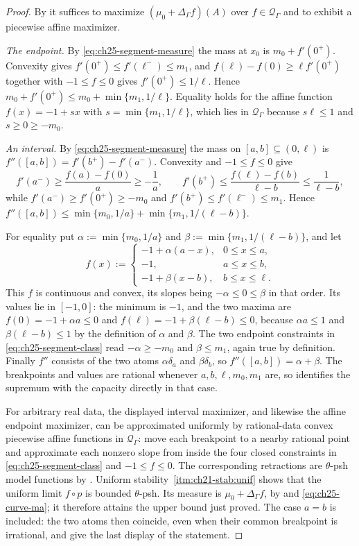 \begin{proof}
By  it suffices to maximize
$(\mu_0+\Delta_\Gamma f)(A)$ over $f\in\mathcal Q_\Gamma$ and to exhibit
a piecewise affine maximizer.

\emph{The endpoint.}  By \eqref{eq:ch25-segment-measure} the mass at $x_0$
is $m_0+f'(0^+)$.  Convexity gives
$f'(0^+)\leq f'(\ell^-)\leq m_1$, and
$f(\ell)-f(0)\geq\ell f'(0^+)$ together with $-1\leq f\leq0$ gives
$f'(0^+)\leq1/\ell$.  Hence
$m_0+f'(0^+)\leq m_0+\min\{m_1,1/\ell\}$.  Equality holds for the affine
function $f(x)=-1+sx$ with $s=\min\{m_1,1/\ell\}$, which lies in
$\mathcal Q_\Gamma$ because $s\ell\leq1$ and $s\geq0\geq-m_0$.

\emph{An interval.}  By \eqref{eq:ch25-segment-measure} the mass on
$[a,b]\subseteq(0,\ell)$ is $f''([a,b])=f'(b^+)-f'(a^-)$.  Convexity and
$-1\leq f\leq0$ give
\[
 f'(a^-)\geq\frac{f(a)-f(0)}{a}\geq-\frac1a,
 \qquad
 f'(b^+)\leq\frac{f(\ell)-f(b)}{\ell-b}\leq\frac1{\ell-b},
\]
while $f'(a^-)\geq f'(0^+)\geq-m_0$ and
$f'(b^+)\leq f'(\ell^-)\leq m_1$.  Hence
$f''([a,b])\leq\min\{m_0,1/a\}+\min\{m_1,1/(\ell-b)\}$.

For equality put $\alpha:=\min\{m_0,1/a\}$ and
$\beta:=\min\{m_1,1/(\ell-b)\}$, and let
\[
 f(x):=\begin{cases}
  -1+\alpha(a-x),&0\leq x\leq a,\\
  -1,&a\leq x\leq b,\\
  -1+\beta(x-b),&b\leq x\leq\ell .
 \end{cases}
\]
This $f$ is continuous and convex, its slopes being
$-\alpha\leq0\leq\beta$ in that order.  Its values lie in $[-1,0]$: the
minimum is $-1$, and the two maxima are $f(0)=-1+\alpha a\leq0$ and
$f(\ell)=-1+\beta(\ell-b)\leq0$, because $\alpha a\leq1$ and
$\beta(\ell-b)\leq1$ by the definition of $\alpha$ and $\beta$.  The
two endpoint constraints in \eqref{eq:ch25-segment-class} read
$-\alpha\geq-m_0$ and $\beta\leq m_1$, again true by definition.
Finally $f''$ consists of the two atoms $\alpha\delta_a$ and
$\beta\delta_b$, so $f''([a,b])=\alpha+\beta$.  The breakpoints and
values are rational whenever $a,b,\ell,m_0,m_1$ are, so
 identifies the supremum with the
capacity directly in that case.

For arbitrary real data, the displayed interval maximizer, and likewise
the affine endpoint maximizer, can be approximated uniformly by
rational-data convex piecewise affine functions in
$\mathcal Q_\Gamma$: move each breakpoint to a nearby rational point and
approximate each nonzero slope from inside the four closed constraints in
\eqref{eq:ch25-segment-class} and $-1\leq f\leq0$.  The corresponding
retractions are $\theta$-psh model functions by
.  Uniform stability
\,\cref{itm:ch21-stab:unif} shows that the uniform
limit $f\circ p$ is bounded $\theta$-psh.  Its measure is
$\mu_0+\Delta_\Gamma f$, by
 and \eqref{eq:ch25-curve-ma}; it therefore
attains the upper bound just proved.  The case $a=b$ is included: the two
atoms then coincide, even when their common breakpoint is irrational, and
give the last display of the statement.
\end{proof}

